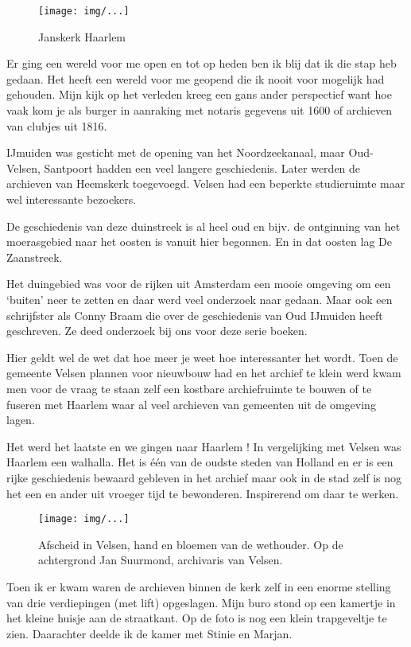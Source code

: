 \documentclass[10pt,twoside,openright]{memoir}
\begin{document}
\begin{figure}[t]
\texttt{[image: img/...]}
\caption{Janskerk Haarlem}
\end{figure}

Er ging een wereld voor me open en tot op heden ben ik blij dat ik die stap heb gedaan. Het heeft een wereld voor me geopend die ik nooit voor mogelijk had gehouden. Mijn kijk op het verleden kreeg een gans ander perspectief want hoe vaak kom je als burger in aanraking met notaris gegevens uit 1600 of archieven van clubjes uit 1816. 

IJmuiden was gesticht met de opening van het Noordzeekanaal, maar Oud-Velsen, Santpoort hadden een veel langere geschiedenis. Later werden de archieven van Heemskerk toegevoegd. Velsen had een beperkte studieruimte maar wel interessante bezoekers. 

De geschiedenis van deze duinstreek is al heel oud en bijv. de ontginning van het moerasgebied naar het oosten is vanuit hier begonnen. En in dat oosten lag De Zaanstreek. 

Het duingebied was voor de rijken uit Amsterdam een mooie omgeving om een ‘buiten’ neer te zetten en daar werd veel onderzoek naar gedaan. Maar ook een schrijfster als Conny Braam die over de geschiedenis van Oud IJmuiden heeft geschreven. Ze deed onderzoek bij ons voor deze serie boeken.

Hier geldt wel de wet dat hoe meer je weet hoe interessanter het wordt. Toen de gemeente Velsen plannen voor nieuwbouw had en het archief te klein werd kwam men voor de vraag te staan zelf een kostbare archiefruimte te bouwen of te fuseren met Haarlem waar al veel archieven van gemeenten uit de omgeving lagen. 

Het werd het laatste en we gingen naar Haarlem ! In vergelijking met Velsen was Haarlem een walhalla. Het is één van de oudste steden van Holland en er is een rijke geschiedenis bewaard gebleven in het archief maar ook in de stad zelf is nog het een en ander uit vroeger tijd te bewonderen. Inspirerend om daar te werken. 

\begin{figure}[t]
\texttt{[image: img/...]}
\caption{Afscheid in Velsen, hand en bloemen van de wethouder. Op de achtergrond Jan Suurmond, archivaris van Velsen.}
\end{figure}

Toen ik er kwam waren de archieven binnen de kerk zelf in een enorme stelling van drie verdiepingen (met lift) opgeslagen. Mijn buro stond op een kamertje in het kleine huisje aan de straatkant. Op de foto is nog een klein trapgeveltje te zien. Daarachter deelde ik de kamer met Stinie en Marjan. 
\end{document}
